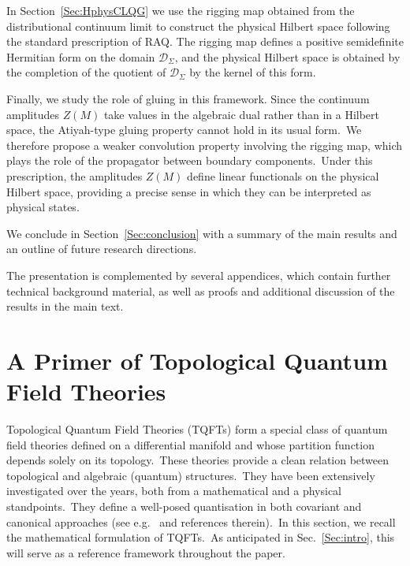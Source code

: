 \documentclass[11pt]{article}
\theoremstyle{definition}
\numberwithin{equation}{section}
\begin{document}
In Section~\ref{Sec:HphysCLQG} we use the rigging map obtained from the distributional continuum limit to construct the physical Hilbert space following the standard prescription of RAQ. The rigging map defines a positive semidefinite Hermitian form on the domain $\mathcal D_\Sigma$, and the physical Hilbert space is obtained by the completion of the quotient of $\mathcal D_\Sigma$ by the kernel of this form. 

Finally, we study the role of gluing in this framework. Since the continuum amplitudes $Z(M)$ take values in the algebraic dual rather than in a Hilbert space, the Atiyah-type gluing property cannot hold in its usual form.~We therefore propose a weaker convolution property involving the rigging map, which plays the role of the propagator between boundary components.~Under this prescription, the amplitudes $Z(M)$ define linear functionals on the physical Hilbert space, providing a precise sense in which they can be interpreted as physical states.

We conclude in Section~\ref{Sec:conclusion} with a summary of the main results and an outline of future research directions.

The presentation is complemented by several appendices, which contain further technical background material, as well as proofs and additional discussion of the results in the main text.

\section{A Primer of Topological Quantum Field Theories}\label{Sec:TQFT}

Topological Quantum Field Theories (TQFTs) form a special class of quantum field theories defined on a differential manifold and whose partition function depends solely on its topology.~These theories provide a clean relation between topological and algebraic (quantum) structures.~They have been extensively investigated over the years, both from a mathematical and a physical standpoints.~They define a well-posed quantisation in both covariant and canonical approaches (see e.g.~\cite{Atiyah_1990} and references therein).~In this section, we  recall the mathematical formulation of TQFTs.~As anticipated in Sec.~\ref{Sec:intro}, this will serve as a reference framework throughout the paper.
\end{document}
